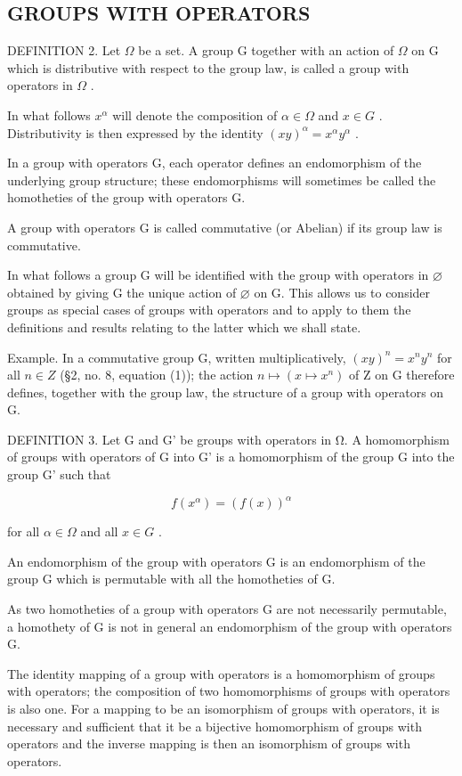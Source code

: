 \subsection{GROUPS WITH OPERATORS}

DEFINITION 2. Let \(\Omega\) be a set. A group G together with an action of \(\Omega\) on G which is distributive with respect to the group law, is called a group with operators in \(\Omega\) .

In what follows \(x^{\alpha}\) will denote the composition of \(\alpha\in\Omega\) and \(x\in G\) . Distributivity is then expressed by the identity \((xy)^{\alpha}=x^{\alpha}y^{\alpha}\) .

In a group with operators G, each operator defines an endomorphism of the underlying group structure; these endomorphisms will sometimes be called the homotheties of the group with operators G.

A group with operators G is called commutative (or Abelian) if its group law is commutative.

In what follows a group G will be identified with the group with operators in \(\varnothing\) obtained by giving G the unique action of \(\varnothing\) on G. This allows us to consider groups as special cases of groups with operators and to apply to them the definitions and results relating to the latter which we shall state.

Example. In a commutative group G, written multiplicatively, \((xy)^{n} = x^{n}y^{n}\) for all \(n \in Z\) (§2, no. 8, equation (1)); the action \(n \mapsto (x \mapsto x^{n})\) of Z on G therefore defines, together with the group law, the structure of a group with operators on G.

DEFINITION 3. Let G and G' be groups with operators in Ω. A homomorphism of groups with operators of G into G' is a homomorphism of the group G into the group G' such that

\[
f (x ^ {\alpha}) = (f (x)) ^ {\alpha}
\]

for all \(\alpha \in \Omega\) and all \(x \in G\) .

An endomorphism of the group with operators G is an endomorphism of the group G which is permutable with all the homotheties of G.

As two homotheties of a group with operators G are not necessarily permutable, a homothety of G is not in general an endomorphism of the group with operators G.

The identity mapping of a group with operators is a homomorphism of groups with operators; the composition of two homomorphisms of groups with operators is also one. For a mapping to be an isomorphism of groups with operators, it is necessary and sufficient that it be a bijective homomorphism of groups with operators and the inverse mapping is then an isomorphism of groups with operators.


